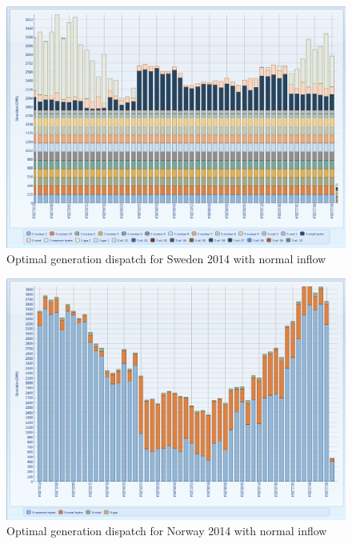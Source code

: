 \documentclass{article}
\begin{document}
\begin{figure}[htbp]
\begin{center}
\includegraphics[width=13cm,keepaspectratio=true]{figures/MTgenerationS}
\caption{Optimal generation dispatch for Sweden 2014 with normal inflow}
\label{fig:MTgenerationSnormal}
\end{center}
\end{figure}
\begin{figure}[htbp]
\begin{center}
\includegraphics[width=13cm,keepaspectratio=true]{figures/MTgenerationN}
\caption{Optimal generation dispatch for Norway 2014 with normal inflow}
\label{fig:MTgenerationNnormal}
\end{center}
\end{figure}
\end{document}
